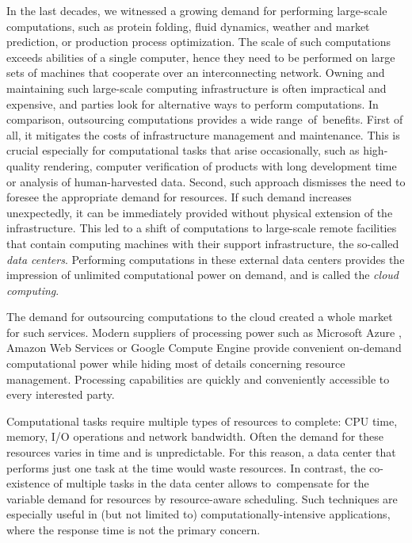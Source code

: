 \indent
In the last decades, we witnessed a growing demand for performing large-scale
computations, such as protein folding, fluid dynamics, weather and market prediction, or production process optimization.
The scale of such computations exceeds abilities of a single computer, hence they need to be performed on large sets of machines that cooperate over an interconnecting network.
Owning and maintaining such large-scale computing infrastructure is often impractical and expensive, and parties look for alternative ways to perform computations.
In comparison, outsourcing computations provides a wide range~of~benefits.
First of all, it mitigates the costs of infrastructure management and maintenance.
This is crucial especially for computational tasks that arise occasionally, such as high-quality rendering, computer verification of products with long development time or analysis of human-harvested data.
Second, such approach dismisses the need to foresee the appropriate demand for resources.
If such demand increases unexpectedly, it can be immediately provided without physical extension of the infrastructure.
This led to a shift of computations to large-scale remote facilities that contain computing machines with their support infrastructure, the so-called \emph{data centers}.
Performing computations in these external data centers provides the impression of unlimited computational power on demand, and is called the \emph{cloud computing}.

The demand for outsourcing computations to the cloud created a whole market for such services.
Modern suppliers of processing power such as Microsoft Azure \cite{url-azure}, Amazon Web Services \cite{url-amazon-ec2} or Google Compute Engine \cite{url-gce} provide convenient on-demand computational power while hiding most of details concerning resource management.
Processing capabilities are quickly and conveniently accessible to every interested party.

Computational tasks require multiple types of resources to complete: CPU time, memory, I/O operations and network bandwidth.
Often the demand for these resources varies in time and is unpredictable.
For this reason, a data center that performs just one task at the time would waste resources.
In contrast, the co-existence of multiple tasks in the data center allows to~compensate for the variable demand for resources by resource-aware scheduling.
Such techniques are especially useful in (but not limited to) computationally-intensive applications, where the response time is not the primary concern.

